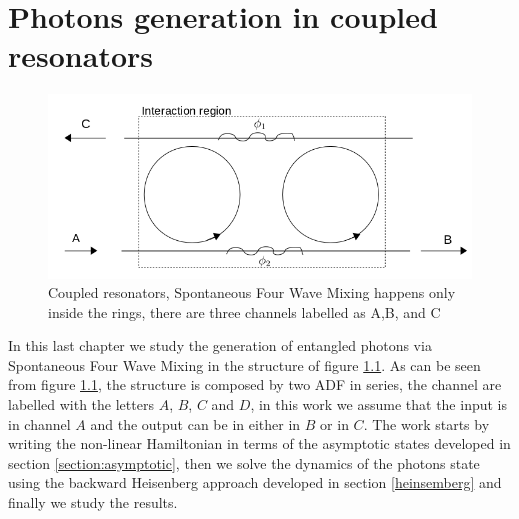 \chapter{Photons generation in coupled resonators}
\begin{figure}[H]
\centering
\includegraphics[width = .8\textwidth]{img/system}
\caption{Coupled resonators, Spontaneous Four Wave Mixing happens only inside the rings, there are three channels labelled as A,B, and C}
\label{couplesstructure}
\end{figure}

In this last chapter we study the generation of entangled photons via Spontaneous Four Wave Mixing in the structure of figure \ref{couplesstructure}. As can be seen from figure \ref{couplesstructure}, the structure is composed by two ADF in series, the channel are labelled with the letters $A$, $B$, $C$ and $D$, in this work we assume that the input is in channel $A$ and the output can be in either in $B$ or in $C$. The work starts by writing the non-linear Hamiltonian in terms of the asymptotic states developed in section \ref{section:asymptotic}, then we solve the dynamics of the photons state using the backward Heisenberg approach developed in section \ref{heinsemberg} and finally we study the results.
